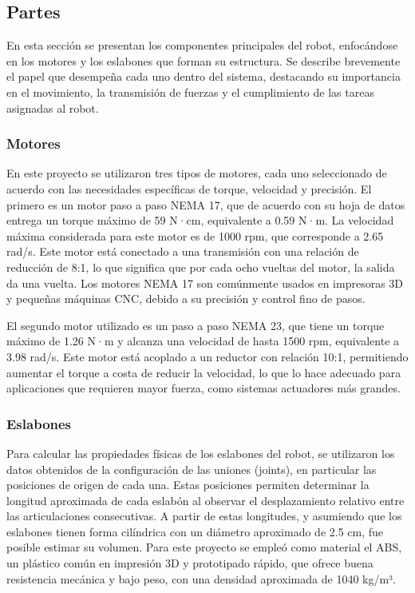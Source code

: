 \subsection{Partes} \label{subsec:partes}
En esta sección se presentan los componentes principales del robot, enfocándose en los motores y los eslabones que forman su estructura. Se describe brevemente el papel que desempeña cada uno dentro del sistema, destacando su importancia en el movimiento, la transmisión de fuerzas y el cumplimiento de las tareas asignadas al robot.


\subsubsection{Motores} \label{subsubsec:motores}

En este proyecto se utilizaron tres tipos de motores, cada uno seleccionado de acuerdo con las necesidades específicas de torque, velocidad y precisión. El primero es un motor paso a paso NEMA 17, que de acuerdo con su hoja de datos entrega un torque máximo de 59 N·cm, equivalente a 0.59 N·m. La velocidad máxima considerada para este motor es de 1000 rpm, que corresponde a 2.65 rad/s. Este motor está conectado a una transmisión con una relación de reducción de 8:1, lo que significa que por cada ocho vueltas del motor, la salida da una vuelta. Los motores NEMA 17 son comúnmente usados en impresoras 3D y pequeñas máquinas CNC, debido a su precisión y control fino de pasos.

El segundo motor utilizado es un paso a paso NEMA 23, que tiene un torque máximo de 1.26 N·m y alcanza una velocidad de hasta 1500 rpm, equivalente a 3.98 rad/s. Este motor está acoplado a un reductor con relación 10:1, permitiendo aumentar el torque a costa de reducir la velocidad, lo que lo hace adecuado para aplicaciones que requieren mayor fuerza, como sistemas actuadores más grandes.



\subsubsection{Eslabones} \label{subsubsec:eslabones}


Para calcular las propiedades físicas de los eslabones del robot, se utilizaron los datos obtenidos de la configuración de las uniones (joints), en particular las posiciones de origen de cada una. Estas posiciones permiten determinar la longitud aproximada de cada eslabón al observar el desplazamiento relativo entre las articulaciones consecutivas. A partir de estas longitudes, y asumiendo que los eslabones tienen forma cilíndrica con un diámetro aproximado de 2.5 cm, fue posible estimar su volumen. Para este proyecto se empleó como material el ABS, un plástico común en impresión 3D y prototipado rápido, que ofrece buena resistencia mecánica y bajo peso, con una densidad aproximada de 1040 kg/m³.

